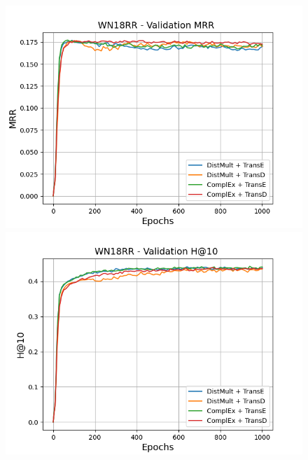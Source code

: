 \begin{figure}[H]
    \centering
    \begin{minipage}{.5\textwidth}
      \centering
      \includegraphics[width=\linewidth]{figures/results/gan_train/not_pretrained/uncertainty/max/entropy/wn18rr/1k_epochs/uncertainty_wn18rr_mrrs.png}
    \end{minipage}%
    \begin{minipage}{.5\textwidth}
      \centering
      \includegraphics[width=\linewidth]{figures/results/gan_train/not_pretrained/uncertainty/max/entropy/wn18rr/1k_epochs/uncertainty_wn18rr_hit10.png}
    \end{minipage}
    

\end{figure}
